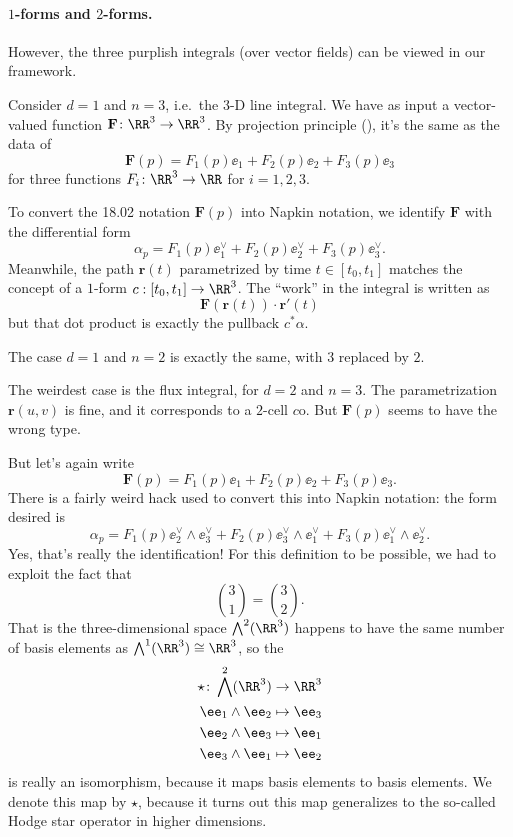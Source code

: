 \paragraph{$1$-forms and $2$-forms.}
However, the three purplish integrals (over vector fields) can be viewed in our framework.
\begin{itemize}
	\ii Consider $d = 1$ and $n = 3$, i.e.\ the 3-D line integral.
	We have as input a vector-valued function $\mathbf{F} \colon \RR^3 \to \RR^3$.
	By projection principle (), it's the same as the data of
	\[ \mathbf{F}(p) = F_1(p) \ee_1 + F_2(p) \ee_2 + F_3(p) \ee_3 \]
	for three functions $F_i \colon \RR^3 \to \RR$ for $i = 1, 2, 3$.

	To convert the 18.02 notation $\mathbf{F}(p)$ into Napkin notation,
	we identify $\mathbf{F}$ with the differential form
	\[ \alpha_p = F_1(p) \ee_1^\vee + F_2(p) \ee_2^\vee + F_3(p) \ee_3^\vee. \]
	Meanwhile, the path $\mathbf{r}(t)$ parametrized by time $t \in [t_0, t_1]$
	matches the concept of a $1$-form $c : [t_0, t_1] \to \RR^3$.
	The ``work'' in the integral is written as
	\[ \mathbf F(\mathbf{r}(t)) \cdot \mathbf{r}'(t) \]
	but that dot product is exactly the pullback $c^\ast\alpha$.

	\ii The case $d = 1$ and $n = 2$ is exactly the same, with $3$ replaced by $2$.

	\ii The weirdest case is the flux integral, for $d = 2$ and $n = 3$.
	The parametrization $\mathbf{r}(u,v)$ is fine, and it corresponds to a $2$-cell $c$o.
	But $\mathbf{F}(p)$ seems to have the wrong type.

	But let's again write
	\[ \mathbf{F}(p) = F_1(p) \ee_1 + F_2(p) \ee_2 + F_3(p) \ee_3. \]
	There is a fairly weird hack used to convert this into Napkin notation: the form desired is
	\[ \alpha_p = F_1(p) \ee_2^\vee \wedge \ee_3^\vee
		+ F_2(p) \ee_3^\vee \wedge \ee_1^\vee
		+ F_3(p) \ee_1^\vee \wedge \ee_2^\vee. \]
	Yes, that's really the identification!
	For this definition to be possible, we had to exploit the fact that
	\[ \binom 31 = \binom 32. \]
	That is the three-dimensional space $\bigwedge^2(\RR^3)$
	happens to have the same number of basis elements as $\bigwedge^1(\RR^3) \cong \RR^3$, so the
	\begin{align*}
		\star \colon \bigwedge^2(\RR^3) &\to \RR^3 \\
		\ee_1 \wedge \ee_2 &\mapsto \ee_3 \\
		\ee_2 \wedge \ee_3 &\mapsto \ee_1 \\
		\ee_3 \wedge \ee_1 &\mapsto \ee_2
	\end{align*}
	is really an isomorphism, because it maps basis elements to basis elements.
	We denote this map by $\star$,
	because it turns out this map generalizes to the so-called Hodge star operator in higher dimensions.


\end{itemize}
